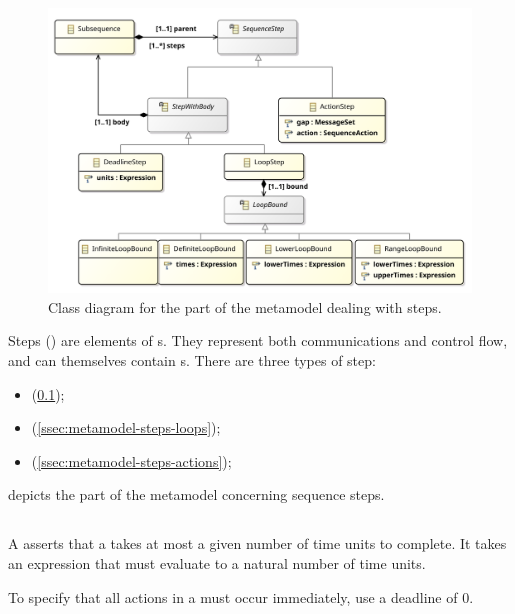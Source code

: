 \begin{figure}[htb]
	\centering
	\includegraphics[width=\textwidth]{diagrams/Steps}
	\caption{Class diagram for the part of the \langname{} metamodel dealing with steps.}
	\label{fig:metamodel-steps}
\end{figure}

\noindent
Steps (\msequencestep) are elements of
\msubsequence s.  They represent both communications and control flow, and
can themselves contain \msubsequence s.  There are three types of
step:

\begin{itemize}
\item \mdeadlinestep{} (\cref{ssec:metamodel-steps-deadlines});
\item \mloopstep{} (\cref{ssec:metamodel-steps-loops});
\item \mactionstep{} (\cref{ssec:metamodel-steps-actions});
\end{itemize}

 depicts the part of the metamodel concerning
sequence steps.

\subsection{\mdeadlinestep}\label{ssec:metamodel-steps-deadlines}

A \mdeadlinestep{} asserts that a \msubsequence{} takes at most
a given number of time units to complete.
It takes an expression that must
evaluate to a natural number of time units.

\begin{remark}
To specify that all actions in a \msubsequence{} must occur
immediately, use a deadline of \(0\).
\end{remark}

